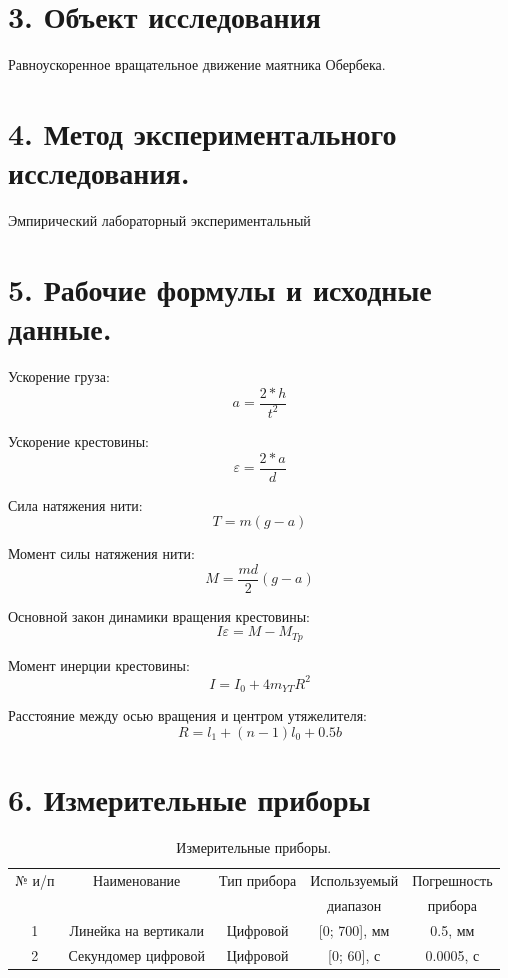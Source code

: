 \documentclass[14pt]{extreport}
\begin{document}
\section*{3. Объект исследования}
Равноускоренное вращательное движение маятника Обербека.

\section*{4. Метод экспериментального исследования.}
Эмпирический лабораторный экспериментальный

\section*{5. Рабочие формулы и исходные данные.}
Ускорение груза:
\begin{equation}\label{f1}
    a = \frac{2*h}{t^2}
\end{equation}

Ускорение крестовины:
\begin{equation}\label{f1}
    \varepsilon = \frac{2*a}{d}
\end{equation}

Сила натяжения нити:
\begin{equation}\label{f1}
    T = m(g - a)
\end{equation}

Момент силы натяжения нити:
\begin{equation}\label{f1}
    M = \frac{md}{2}(g - a)
\end{equation}

Основной закон динамики вращения крестовины:
\begin{equation}\label{f1}
    I\varepsilon = M - M_{Tp}
\end{equation}

Момент инерции крестовины:
\begin{equation}\label{f1}
    I = I_{0} + 4m_{YT}R^2
\end{equation}

Расстояние между осью вращения и центром утяжелителя:
\begin{equation}\label{f1}
    R = l_{1} + (n-1)l_{0} + 0.5b
\end{equation}

\section*{6. Измерительные приборы}
\begin{table}[H]\label{t1}
\caption{Измерительные приборы.}
\centering
\begin{tabular}{|c|c|c|c|c|}
\hline
 № и/п & Наименование & Тип прибора & Используемый & Погрешность \\ 
 & & & диапазон & прибора \\ \hline
 1 & Линейка на вертикали & Цифровой & [0; 700], мм & 0.5, мм \\ \hline
 2 & Секундомер цифровой & Цифровой & [0; 60], с & 0.0005, с \\ \hline
 
\end{tabular}
\end{table}
\end{document}
